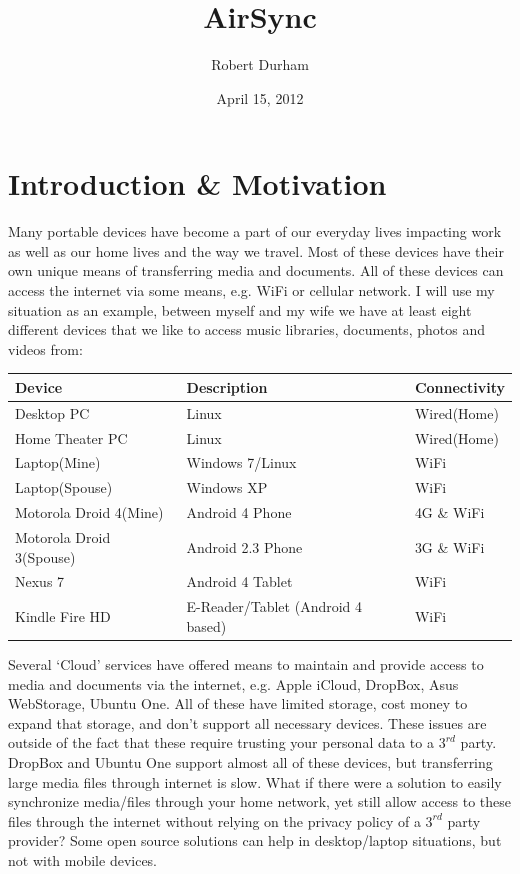 \documentclass[12pt]{article}
\begin{document}
\title {AirSync}
\author {Robert Durham}
\date {April 15, 2012}
\maketitle

\section{Introduction \& Motivation}
Many portable devices have become a part of our everyday lives impacting work as well as our home lives and the way we travel. Most of these devices have their own unique means of transferring media and documents. All of these devices can access the internet via some means, e.g. WiFi or cellular network. I will use my situation as an example, between myself and my wife we have at least eight different devices that we like to access music libraries, documents, photos and videos from:

\footnotesize
\begin{center}
\begin{tabular}{|l|l|l|}
\hline
	\textbf{Device} & \textbf{Description} & \textbf{Connectivity}\\
\hline
	Desktop PC & Linux & Wired(Home)\\
\hline 
	Home Theater PC & Linux & Wired(Home)\\
\hline
	Laptop(Mine) & Windows 7/Linux & WiFi\\
\hline
	Laptop(Spouse) & Windows XP & WiFi\\
\hline
	Motorola Droid 4(Mine) & Android 4 Phone & 4G \& WiFi\\
\hline
	Motorola Droid 3(Spouse) & Android 2.3 Phone & 3G \& WiFi\\
\hline
	Nexus 7 & Android 4 Tablet & WiFi\\
\hline
	Kindle Fire HD & E-Reader/Tablet (Android 4 based) & WiFi\\
\hline
\end{tabular}
\end{center}
\normalsize
Several `Cloud' services have offered means to maintain and provide access to media and documents via the internet, e.g. Apple iCloud, DropBox, Asus WebStorage, Ubuntu One. All of these have limited storage, cost money to expand that storage, and don't support all necessary devices. These issues are outside of the fact that these require trusting your personal data to a $3^{rd}$ party. DropBox and Ubuntu One support almost all of these devices, but transferring large media files through internet is slow. What if there were a solution to easily synchronize media/files through your home network, yet still allow access to these files through the internet without relying on the privacy policy of a $3^{rd}$ party provider? Some open source solutions can help in desktop/laptop situations, but not with mobile devices.
\end{document}
